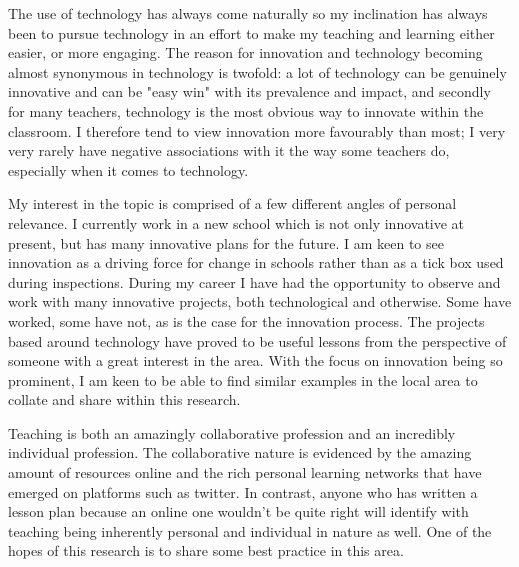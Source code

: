 The use of technology has always come naturally so my inclination has always been to pursue technology in an effort to make my teaching and learning either easier, or more engaging. The reason for innovation and technology becoming almost synonymous in technology is twofold: a lot of technology can be genuinely innovative and can be "easy win" with its prevalence and impact, and secondly for many teachers, technology is the most obvious way to innovate within the classroom. I therefore tend to view innovation more favourably than most; I very very rarely have negative associations with it the way some teachers do, especially when it comes to technology.

My interest in the topic is comprised of a few different angles of personal relevance. I currently work in a new school which is not only innovative at present, but has many innovative plans for the future. I am keen to see innovation as a driving force for change in schools rather than as a tick box used during inspections. During my career I have had the opportunity to observe and work with many innovative projects, both technological and otherwise. Some have worked, some have not, as is the case for the innovation process. The projects based around technology have proved to be useful lessons from the perspective of someone with a great interest in the area. With the focus on innovation being so prominent, I am keen to be able to find similar examples in the local area to collate and share within this research.

Teaching is both an amazingly collaborative profession and an incredibly individual profession. The collaborative nature is evidenced by the amazing amount of resources online and the rich personal learning networks that have emerged on platforms such as twitter. In contrast, anyone who has written a lesson plan because an online one wouldn't be quite right will identify with teaching being inherently personal and individual  in nature as well. One of the hopes of this research is to share some best practice in this area.

